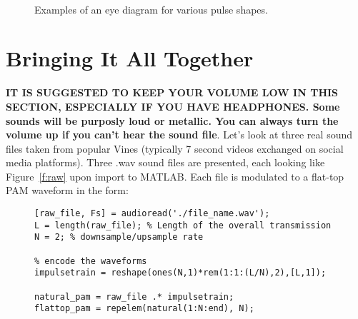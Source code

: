 \documentclass[letterpaper,12pt]{article}
\begin{document}
\begin{figure}[h]
 \centering
\\
 \caption{Examples of an eye diagram for various pulse shapes.}\label{f:p1_eyediags}
\end{figure}



\section{Bringing It All Together}

\textbf{IT IS SUGGESTED TO KEEP YOUR VOLUME LOW IN THIS SECTION, ESPECIALLY IF YOU HAVE HEADPHONES. Some sounds will be purposly loud or metallic. You can always turn the volume up if you can't hear the sound file}. Let's look at three real sound files taken from popular Vines (typically 7 second videos exchanged on social media platforms). Three .wav sound files are presented, each looking like Figure~\ref{f:raw} upon import to MATLAB. Each file is modulated to a flat-top PAM waveform in the form:

\begin{figure}[h]
\centering
\begin{minipage}[framed]{0.9\textwidth}
\begin{lstlisting}
[raw_file, Fs] = audioread('./file_name.wav');
L = length(raw_file); % Length of the overall transmission
N = 2; % downsample/upsample rate

% encode the waveforms
impulsetrain = reshape(ones(N,1)*rem(1:1:(L/N),2),[L,1]);

natural_pam = raw_file .* impulsetrain;
flattop_pam = repelem(natural(1:N:end), N);
\end{lstlisting}
\end{minipage}
\captionsetup{labelformat=empty}
\end{figure}
\end{document}
